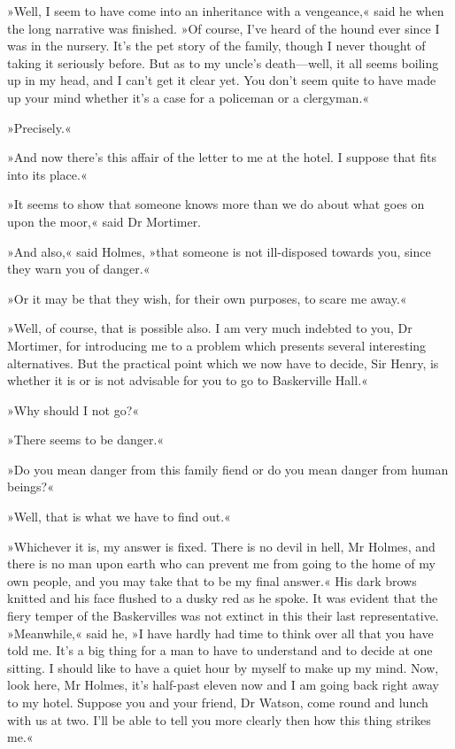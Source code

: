 »Well, I seem to have come into an inheritance with a vengeance,« said he when the long narrative was finished. »Of course, I've heard of the hound ever since I was in the nursery. It's the pet story of the family, though I never thought of taking it seriously before. But as to my uncle's death—well, it all seems boiling up in my head, and I can't get it clear yet. You don't seem quite to have made up your mind whether it's a case for a policeman or a clergyman.«

»Precisely.«

»And now there's this affair of the letter to me at the hotel. I suppose that fits into its place.«

»It seems to show that someone knows more than we do about what goes on upon the moor,« said Dr Mortimer.

»And also,« said Holmes, »that someone is not ill-disposed towards you, since they warn you of danger.«

»Or it may be that they wish, for their own purposes, to scare me away.«

»Well, of course, that is possible also. I am very much indebted to you, Dr Mortimer, for introducing me to a problem which presents several interesting alternatives. But the practical point which we now have to decide, Sir Henry, is whether it is or is not advisable for you to go to Baskerville Hall.«

»Why should I not go?«

»There seems to be danger.«

»Do you mean danger from this family fiend or do you mean danger from human beings?«

»Well, that is what we have to find out.«

»Whichever it is, my answer is fixed. There is no devil in hell, Mr Holmes, and there is no man upon earth who can prevent me from going to the home of my own people, and you may take that to be my final answer.« His dark brows knitted and his face flushed to a dusky red as he spoke. It was evident that the fiery temper of the Baskervilles was not extinct in this their last representative. »Meanwhile,« said he, »I have hardly had time to think over all that you have told me. It's a big thing for a man to have to understand and to decide at one sitting. I should like to have a quiet hour by myself to make up my mind. Now, look here, Mr Holmes, it's half-past eleven now and I am going back right away to my hotel. Suppose you and your friend, Dr Watson, come round and lunch with us at two. I'll be able to tell you more clearly then how this thing strikes me.«

